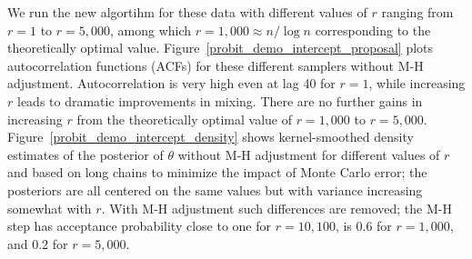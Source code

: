 \documentclass[10pt]{article}
\begin{document}
We run the new algortihm for these data with different values of $r$ ranging from $r=1$ to $r=5,000$, among which $r=1,000 \approx n/\log n$ corresponding to the theoretically optimal value.  Figure~\ref{probit_demo_intercept_proposal} plots autocorrelation functions (ACFs) for these different samplers without  M-H adjustment. Autocorrelation is very high even at lag 40 for $r=1$, while increasing $r$ leads to dramatic improvements in mixing. There are no further gains in increasing $r$ from the theoretically optimal value of $r=1,000$ to $r=5,000$. Figure~\ref{probit_demo_intercept_density} shows kernel-smoothed density estimates of the posterior of $\theta$ without M-H adjustment for different values of $r$ and based on long chains to minimize the impact of Monte Carlo error; the posteriors are all centered on the same values but with variance increasing somewhat with $r$.  With M-H adjustment such differences are removed; the M-H step has acceptance probability close to one for $r=10,100$, is 0.6 for $r=1,000$, and 0.2 for $r=5,000$.
\end{document}
